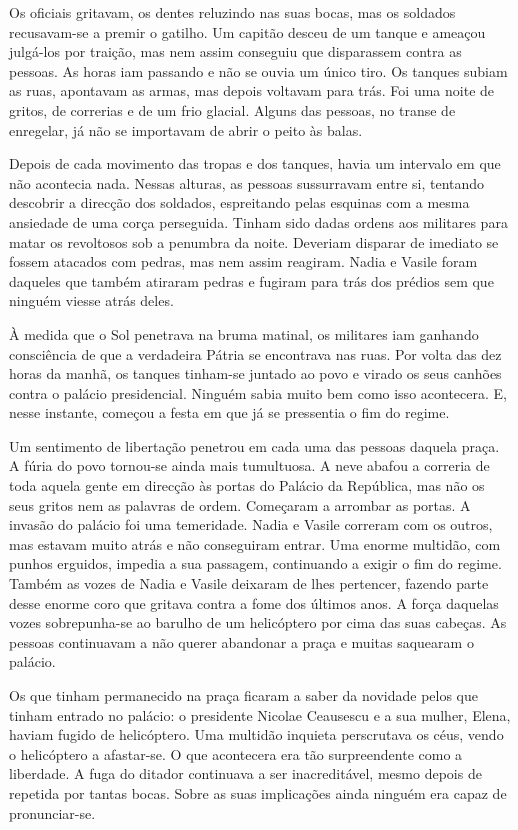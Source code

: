 Os oficiais gritavam, os dentes reluzindo nas suas bocas, mas os
soldados recusavam-se a premir o gatilho. Um capitão desceu de um tanque
e ameaçou julgá-los por traição, mas nem assim conseguiu que disparassem
contra as pessoas. As horas iam passando e não se ouvia um único tiro.
Os tanques subiam as ruas, apontavam as armas, mas depois voltavam para
trás. Foi uma noite de gritos, de correrias e de um frio glacial. Alguns
das pessoas, no transe de enregelar, já não se importavam de abrir o
peito às balas.

Depois de cada movimento das tropas e dos tanques, havia um intervalo em
que não acontecia nada. Nessas alturas, as pessoas sussurravam entre si,
tentando descobrir a direcção dos soldados, espreitando pelas esquinas
com a mesma ansiedade de uma corça perseguida. Tinham sido dadas ordens
aos militares para matar os revoltosos sob a penumbra da noite. Deveriam
disparar de imediato
se fossem atacados com pedras, mas nem assim reagiram. Nadia e Vasile
foram daqueles que também atiraram pedras e fugiram para trás dos
prédios sem que ninguém viesse atrás deles.

À medida que o Sol penetrava na bruma matinal, os militares iam ganhando
consciência de que a verdadeira Pátria se encontrava nas ruas. Por volta
das dez horas da manhã, os tanques tinham-se juntado ao povo e virado os
seus canhões contra o palácio presidencial. Ninguém sabia muito bem como
isso acontecera. E, nesse instante, começou a festa em que já se
pressentia o fim do regime.

Um sentimento de libertação penetrou em cada uma das pessoas daquela
praça. A fúria do povo tornou-se ainda mais tumultuosa. A neve abafou a
correria de toda aquela gente em direcção às portas do Palácio da
República, mas não os seus gritos nem as palavras de ordem. Começaram a
arrombar as portas. A invasão do palácio foi uma temeridade. Nadia e
Vasile correram com os outros, mas estavam muito atrás e não
conseguiram entrar. Uma enorme multidão, com punhos erguidos, impedia a
sua passagem, continuando a exigir o fim do regime. Também as vozes de
Nadia e Vasile deixaram de lhes pertencer, fazendo parte desse enorme
coro que gritava contra a fome dos últimos anos. A força daquelas vozes
sobrepunha-se ao barulho de um helicóptero por cima das suas cabeças. As
pessoas continuavam a não querer abandonar a praça e muitas saquearam o
palácio.

Os que tinham permanecido na praça ficaram a saber da novidade pelos que
tinham entrado no palácio: o presidente Nicolae Ceausescu e a sua mulher, Elena, haviam fugido de
helicóptero. Uma multidão inquieta perscrutava os céus, vendo o
helicóptero a afastar-se. O que acontecera era tão surpreendente como a
liberdade. A fuga do ditador continuava a ser inacreditável, mesmo
depois de repetida por tantas bocas. Sobre as suas implicações ainda
ninguém era capaz de pronunciar-se.

